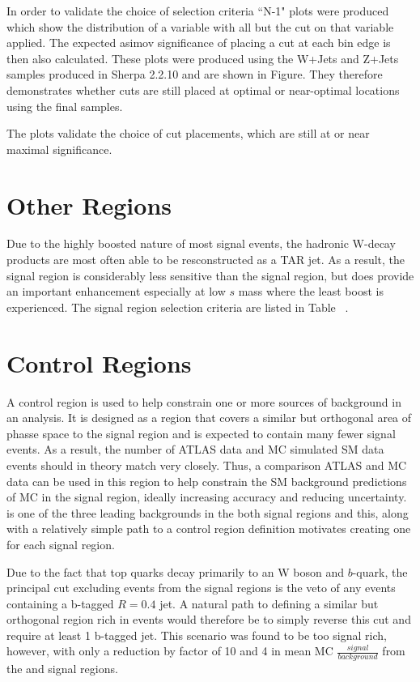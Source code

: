 In order to validate the choice of selection criteria ``N-1" plots were produced which show the distribution of a variable with all but the cut on that variable applied. The expected asimov significance of placing a cut at each bin edge is then also calculated. These plots were produced using the W+Jets and Z+Jets samples produced in Sherpa 2.2.10 and are shown in Figure. They therefore demonstrates whether cuts are still placed at optimal or near-optimal locations using the final samples.

The plots validate the choice of cut placements, which are still at or near maximal significance.

\section{Other Regions}
Due to the highly boosted nature of most signal events, the hadronic W-decay products are most often able to be resconstructed as a TAR jet. As a result, the \resolved signal region is considerably less sensitive than the \merged signal region, but does provide an important enhancement especially at low $s$ mass where the least boost is experienced. The \resolved signal region selection criteria are listed in Table ~.

\section{\ttbar Control Regions}
A control region is used to help constrain one or more sources of background in an analysis. It is designed as a region that covers a similar but orthogonal area of phasse space to the signal region and is expected to contain many fewer signal events. As a result, the number of ATLAS data and MC simulated SM data events should in theory match very closely. Thus, a comparison ATLAS and MC data can be used in this region to help constrain the SM background predictions of MC in the signal region, ideally increasing accuracy and reducing uncertainty. \ttbar is one of the three leading backgrounds in the both signal regions and this, along with a relatively simple path to a control region definition motivates creating one for each signal region.

Due to the fact that top quarks decay primarily to an W boson and $b$-quark, the principal cut excluding \ttbar events from the signal regions is the veto of any events containing a b-tagged \akt $R=0.4$ jet. A natural path to defining a similar but orthogonal region rich in \ttbar events would therefore be to simply reverse this cut and require at least 1 b-tagged jet. This scenario was found to be too signal rich, however, with only a reduction by factor of 10 and 4 in mean MC $\frac{signal}{background}$ from the \merged and \resolved signal regions.


